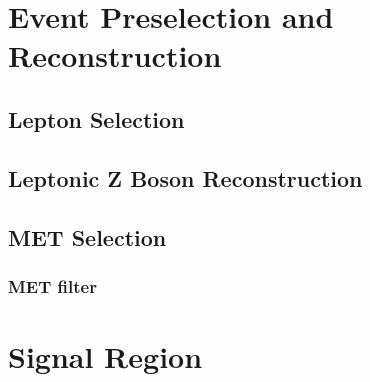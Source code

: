 \section{Event Preselection and Reconstruction}
\subsection{Lepton Selection}
\subsection{Leptonic Z Boson Reconstruction}
\subsection{MET Selection}
\subsubsection{MET filter}

\section{Signal Region}
